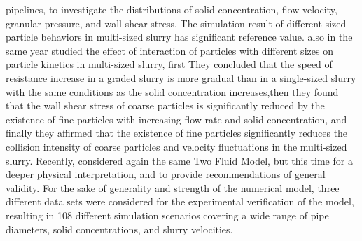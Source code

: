 \documentclass[review,3p,times,12pt]{elsarticle}
\begin{document}
pipelines, to investigate the distributions of solid concentration, flow velocity, granular pressure, and wall shear stress. The simulation result of different-sized particle behaviors in multi-sized slurry has significant reference value. \citet{Li-2018b} also in the same year studied the effect of interaction of particles with different sizes on particle kinetics in multi-sized slurry, first They concluded that the speed of resistance increase in a graded slurry is more gradual than in a single-sized slurry with the same conditions as the solid concentration increases,then they found that the wall shear stress of coarse particles is significantly reduced by the existence of fine particles with increasing flow rate and solid concentration, and finally they affirmed that the existence of fine particles significantly reduces the collision intensity of coarse particles and velocity fluctuations in the multi-sized slurry. Recently, \citet{Messa-2020} considered again the same Two Fluid Model, but this time for a  deeper physical interpretation, and to provide recommendations of general validity. For the sake of generality and strength of the numerical model, three different data sets were considered for the experimental verification of the model, resulting in 108 different simulation scenarios covering a wide range of pipe diameters, solid concentrations, and slurry velocities.


\end{document}
